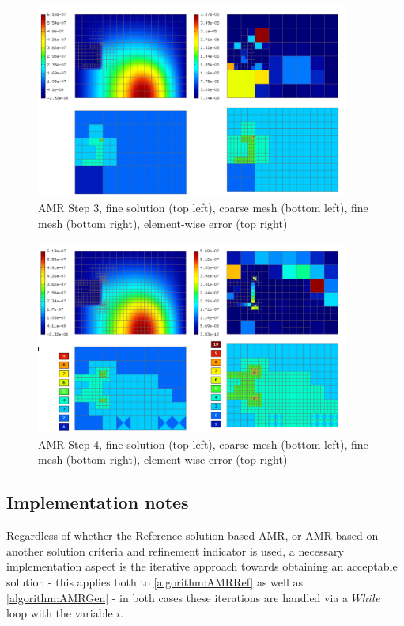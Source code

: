 \vspace{-4mm}
\begin{figure}[H]
	\begin{center}
		\includegraphics[width=0.92\textwidth]{img/adapt/ref/3.jpg}
		\caption{AMR Step 3, fine solution (top left), coarse mesh (bottom left), fine mesh (bottom right), element-wise error (top right)}
	\label{figure:amrRef3}
	\end{center}
\end{figure}
\vspace{-4mm}
\begin{figure}[H]
	\begin{center}
		\includegraphics[width=0.92\textwidth]{img/adapt/ref/4.jpg}
		\caption{AMR Step 4, fine solution (top left), coarse mesh (bottom left), fine mesh (bottom right), element-wise error (top right)}
	\label{figure:amrRef4}
	\end{center}
\end{figure}
\vspace{-4mm}

\subsection{Implementation notes}
Regardless of whether the Reference solution-based AMR, or AMR based on another solution criteria and refinement indicator is used, a necessary implementation aspect is the iterative approach towards obtaining an acceptable solution - this applies both to \cref{algorithm:AMRRef} as well as \cref{algorithm:AMRGen} - in both cases these iterations are handled via a $While$ loop with the variable $i$.
